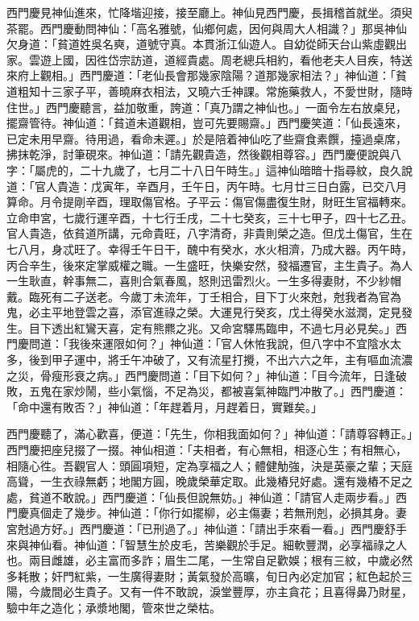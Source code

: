 西門慶見神仙進來，忙降堦迎接，接至廳上。神仙見西門慶，長揖稽首就坐。須臾茶罷。西門慶動問神仙：「高名雅號，仙鄉何處，因何與周大人相識？」那吳神仙欠身道：「貧道姓吳名奭，道號守真。本貫浙江仙遊人。自幼從師天台山紫虛觀出家。雲遊上國，因徃岱宗訪道，道經貴處。周老總兵相約，看他老夫人目疾，特送來府上觀相。」西門慶道：「老仙長會那幾家陰陽？道那幾家相法？」神仙道：「貧道粗知十三家子平，善曉麻衣相法，又曉六壬神課。常施藥救人，不愛世財，隨時住世。」西門慶聽言，益加敬重，誇道：「真乃謂之神仙也。」一面令左右放桌兒，擺齋管待。神仙道：「貧道未道觀相，豈可先要賜齋。」西門慶笑道：「仙長遠來，已定未用早齋。待用過，看命未遲。」於是陪着神仙吃了些齋食素饌，擡過桌席，拂抹乾淨，討筆硯來。神仙道：「請先觀貴造，然後觀相尊容。」{}西門慶便說與八字：「屬虎的，二十九歲了，七月二十八日午時生。」這神仙暗暗十指尋紋，良久說道：「官人貴造：戊寅年，辛酉月，壬午日，丙午時。七月廿三日白露，已交八月算命。月令提剛辛酉，理取傷官格。子平云：傷官傷盡復生財，財旺生官福轉來。立命申宮，七歲行運辛酉，十七行壬戌，二十七癸亥，三十七甲子，四十七乙丑。官人貴造，依貧道所講，元命貴旺，八字清奇，非貴則榮之造。但戊土傷官，生在七八月，身忒旺了。幸得壬午日干，醜中有癸水，水火相濟，乃成大器。丙午時，丙合辛生，後來定掌威權之職。一生盛旺，快樂安然，發福遷官，主生貴子。為人一生耿直，幹事無二，喜則合氣春風，怒則迅雷烈火。一生多得妻財，不少紗帽戴。{}臨死有二子送老。今歲丁未流年，丁壬相合，目下丁火來尅，尅我者為官為鬼，必主平地登雲之喜，添官進祿之榮。大運見行癸亥，戊土得癸水滋潤，定見發生。目下透出紅鸞天喜，定有熊羆之兆。又命宮驛馬臨申，不過七月必見矣。」西門慶問道：「我後來運限如何？」神仙道：「官人休恠我說，但八字中不宜陰水太多，後到甲子運中，將壬午冲破了，又有流星打攪，不出六六之年，主有嘔血流濃之災，骨瘦形衰之病。」西門慶問道：「目下如何？」神仙道：「目今流年，日逢破敗，五鬼在家炒鬧，些小氣惱，不足為災，都被喜氣神臨門冲散了。」西門慶道：「命中還有敗否？」神仙道：「年趕着月，月趕着日，實難矣。」

西門慶聽了，滿心歡喜，便道：「先生，你相我面如何？」神仙道：「請尊容轉正。」西門慶把座兒掇了一掇。神仙相道：「夫相者，有心無相，相逐心生；有相無心，相隨心徃。吾觀官人：頭圓項短，定為享福之人；體健觔強，決是英豪之輩；天庭高聳，一生衣祿無虧；地閣方圓，晚歲榮華定取。此幾樁兒好處。還有幾樁不足之處，貧道不敢說。」西門慶道：「仙長但說無妨。」神仙道：「請官人走兩步看。」西門慶真個走了幾步。神仙道：「你行如擺柳，必主傷妻；若無刑剋，必損其身。妻宮尅過方好。」西門慶道：「已刑過了。」神仙道：「請出手來看一看。」西門慶舒手來與神仙看。神仙道：「智慧生於皮毛，苦樂觀於手足。細軟豐潤，必享福祿之人也。兩目雌雄，必主富而多詐；眉生二尾，一生常自足歡娛；根有三紋，中歲必然多耗散；奸門紅紫，一生廣得妻財；黃氣發於高曠，旬日內必定加官；紅色起於三陽，今歲間必生貴子。又有一件不敢說，淚堂豐厚，亦主貪花；且喜得鼻乃財星，驗中年之造化；承漿地閣，管來世之榮枯。

